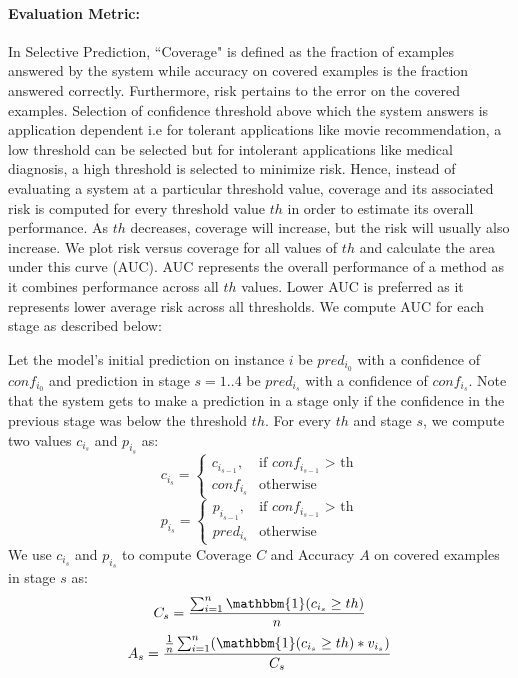 \documentclass[11pt,a4paper]{article}
\begin{document}

\paragraph{Evaluation Metric:}
\label{evaluation_metric}
In Selective Prediction, ``Coverage" is defined as the fraction of examples answered by the system while accuracy on covered examples is the fraction answered correctly. 
Furthermore, risk pertains to the error on the covered examples.
Selection of confidence threshold above which the system answers is application dependent i.e for tolerant applications like movie recommendation, a low threshold can be selected but for intolerant applications like medical diagnosis, a high threshold is selected to minimize risk. 
Hence, instead of evaluating a system at a particular threshold value, coverage and its associated risk is computed for every threshold value $th$ in order to estimate its overall performance.
As $th$ decreases, coverage will increase, but the risk will usually also increase. 
We plot risk versus coverage for all values of $th$ and calculate the area under this curve (AUC). AUC represents the overall performance of a method as it combines performance across all $th$ values. 
Lower AUC is preferred as it represents lower average risk across all thresholds.
We compute AUC for each stage as described below:

Let the model's initial prediction on instance $i$ be $pred_{i_0}$ with a confidence of $conf_{i_0}$ and prediction in stage $s = 1..4$ be $pred_{i_s}$ with a confidence of $conf_{i_s}$.
Note that the system gets to make a prediction in a stage only if the confidence in the previous stage was below the threshold $th$.
For every $th$ and stage $s$, we compute two values $c_{i_s}$ and $p_{i_s}$ as:
\begin{equation*}
        c_{i_s} =
            \begin{cases}
              c_{i_{s-1}}, & \text{if $conf_{i_{s-1}}$ > th} \\
              conf_{i_s} & \text{otherwise}
            \end{cases}
\end{equation*}
\begin{equation*}
        p_{i_s} =
            \begin{cases}
              p_{i_{s-1}}, & \text{if $conf_{i_{s-1}}$ > th} \\
              pred_{i_s} & \text{otherwise}
            \end{cases}
\end{equation*}
We use $c_{i_s}$ and $p_{i_s}$ to compute Coverage $C$ and Accuracy $A$ on covered examples in stage $s$ as:
\begin{equation*}
    C_s = \frac{\sum_{i=1}^n \mathbbm{1}(c_{i_s} \ge th)}{n} 
\end{equation*}
\begin{equation*}
    A_s =\frac{ \frac{1}{n}\sum_{i=1}^n (\mathbbm{1}(c_{i_s} \ge th)*v_{i_s})}{C_s} 
\end{equation*}
\end{document}
